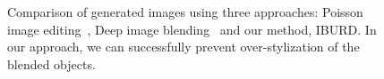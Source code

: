 \begin{figure}  
    \centering
    \scalebox{0.75}{}
    \caption{Comparison of generated images using three approaches:  Poisson image editing~\cite{perez_poisson_2003}, Deep image blending~\cite{zhang_deep_2020} and our method, IBURD. In our approach, we can successfully prevent over-stylization of the blended objects.}  
    \label{fig:compare}
    \vspace{-4mm}
\end{figure}
